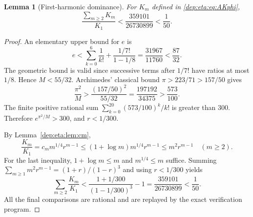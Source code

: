 \documentclass[11pt]{article}
\newtheorem{lemma}[theorem]{Lemma}
\theoremstyle{definition}\newtheorem{definition}[theorem]{Definition}
\theoremstyle{remark}\newtheorem{remark}[theorem]{Remark}
\begin{document}
\begin{lemma}[First-harmonic dominance]\label{dep:eta:lem:tail}
For $K_m$ defined in \eqref{dep:eta:eq:AKphi},
\begin{equation}\label{dep:eta:eq:tail}
 \frac{\sum_{m\ge2}K_m}{K_1}
 <\frac{359101}{26730899}<\frac1{50}.
\end{equation}
\end{lemma}
\begin{proof}
An elementary upper bound for $e$ is
\[
 e<\sum_{k=0}^6\frac1{k!}
           +\frac{1/7!}{1-1/8}
     =\frac{31967}{11760}<\frac{87}{32}.
\]
The geometric bound is valid since successive terms after $1/7!$
have ratios at most $1/8$. Hence $M<55/32$. Archimedes' classical
bound $\pi>223/71>157/50$ gives
\[
 \frac{\pi^2}{M}>\frac{(157/50)^2}{55/32}
     =\frac{197192}{34375}>\frac{573}{100}.
\]
The finite positive rational sum
$\sum_{k=0}^{20}(573/100)^k/k!$ is greater than $300$.
Therefore $e^{\pi^2/M}>300$, and $r<1/300$.

By Lemma~\ref{dep:eta:lem:cm},
\[
 \frac{K_m}{K_1}=c_m m^{1/4}r^{m-1}
        \le(1+\log m)m^{1/4}r^{m-1}
        \le m^2r^{m-1}\quad(m\ge2).
\]
For the last inequality, $1+\log m\le m$ and $m^{1/4}\le m$
suffice. Summing $\sum_{m\ge1}m^2r^{m-1}=(1+r)/(1-r)^3$ and
using $r<1/300$ yields
\[
 \sum_{m\ge2}\frac{K_m}{K_1}
 <\frac{1+1/300}{(1-1/300)^3}-1
 =\frac{359101}{26730899}<\frac1{50}.
\]
All the final comparisons are rational and are replayed by the exact
verification program.
\end{proof}
\end{document}

